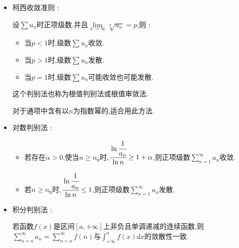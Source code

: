 \documentclass[UTF8,12pt]{ctexbook}
\newcommand{\limNormal}[1]{\lim\limits_{#1}}
\newcommand{\myLimToInf}{\limNormal{x \to \infty}}
\newcommand{\upDownSum}[2]{\sum\limits_{#2}^{#1}}
\newcommand{\defFunction}[1]{f(#1)}
\newcommand{\definiteIntegral}[2]{\int^{#1}_{#2}}
\newcommand{\mediumBigCase}[1]{\left[#1\right]}
\newcommand{\sumSeries}{\upDownSum{\infty}{n = 1}}
\begin{document}
{{{{{\begin{itemize}
{            在比较判别法中,如果去几何级数为比较的标准级数,可得 :

            设$\sum u_n$是通项大于零的正项级数.且$\myLimToInf \cfrac{u_{n + 1}}{u_n} = p$,则 :
            \begin{itemize}
              \item 当$p < 1$时,级数$\sum u_n$收敛.
              \item 当$p > 1$时,级数$\sum u_n$发散.
              \item 当$p = 1$时,无法判断.级数$\sum u_n$可能收敛也可能发散
            \end{itemize}

            这个判别法也被称为比值判别法或者比值审敛法.

            对于多个式子连乘的,适合用此方法.
            }
      \item {
            柯西收敛准则 :

            设$\sum u_n$时正项级数.并且$\myLimToInf \sqrt[n]{u_n} = p$,则 :
            \begin{itemize}
              \item 当$p < 1$时,级数$\sum u_n$收敛.
              \item 当$p > 1$时,级数$\sum u_n$发散.
              \item 当$p = 1$时,级数$\sum u_n$可能收敛也可能发散.
            \end{itemize}

            这个判别法也称为根值判别法或根值审敛法.

            对于通项中含有以$n$为指数幂的,适合用此方法.
            }
      \item{
            对数判别法 :

            \begin{itemize}
              \item 若存在$\alpha > 0$,使当$n \geq n_0$时,$\cfrac{\ln\cfrac{1}{a_n}}{\ln n} \geq 1 + \alpha$,则正项级数$\sumSeries a_n$收敛.
              \item 若$n \geq n_0$时,$\cfrac{\ln\cfrac{1}{a_n}}{\ln n} \leq 1$,则正项级数$\sumSeries a_n$发散.
            \end{itemize}
            }
      \item {
            积分判别法 :

            若函数$\defFunction{x}$是区间$\mediumBigCase{a,+\infty}$上非负且单调递减的连续函数,则$\upDownSum{\infty}{n = a} a_n = \upDownSum{\infty}{n = a} f(n)$与$\definiteIntegral{a}{+\infty}\defFunction{x}dx$的敛散性一致.

}
\end{itemize}}}}}}
\end{document}
